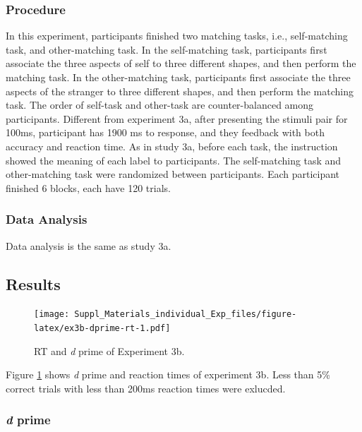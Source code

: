 \documentclass[
  english,
  man]{apa6}
\begin{document}
\hypertarget{procedure-5}{%
\subsubsection{Procedure}\label{procedure-5}}

In this experiment, participants finished two matching tasks, i.e., self-matching task, and other-matching task. In the self-matching task, participants first associate the three aspects of self to three different shapes, and then perform the matching task. In the other-matching task, participants first associate the three aspects of the stranger to three different shapes, and then perform the matching task. The order of self-task and other-task are counter-balanced among participants.
Different from experiment 3a, after presenting the stimuli pair for 100ms, participant has 1900 ms to response, and they feedback with both accuracy and reaction time.
As in study 3a, before each task, the instruction showed the meaning of each label to participants. The self-matching task and other-matching task were randomized between participants. Each participant finished 6 blocks, each have 120 trials.

\hypertarget{data-analysis-4}{%
\subsubsection{Data Analysis}\label{data-analysis-4}}

Data analysis is the same as study 3a.

\hypertarget{results-5}{%
\subsection{Results}\label{results-5}}

\begin{figure}
\centering
\texttt{[image: Suppl\_Materials\_individual\_Exp\_files/figure-latex/ex3b-dprime-rt-1.pdf]}
\caption{\label{fig:ex3b-dprime-rt}RT and \emph{d} prime of Experiment 3b.}
\end{figure}

Figure \ref{fig:ex3b-dprime-rt} shows \emph{d} prime and reaction times of experiment 3b. Less than 5\% correct trials with less than 200ms reaction times were exlucded.

\hypertarget{d-prime-4}{%
\subsubsection{\texorpdfstring{\emph{d} prime}{d prime}}\label{d-prime-4}}
\end{document}
